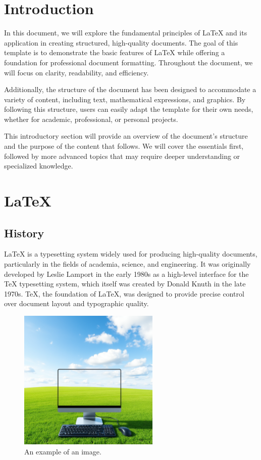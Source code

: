 \chapter{Introduction}

In this document, we will explore the fundamental principles of LaTeX and its application in creating structured, high-quality documents. The goal of this template is to demonstrate the basic features of LaTeX while offering a foundation for professional document formatting. Throughout the document, we will focus on clarity, readability, and efficiency.

Additionally, the structure of the document has been designed to accommodate a variety of content, including text, mathematical expressions, and graphics. By following this structure, users can easily adapt the template for their own needs, whether for academic, professional, or personal projects.

This introductory section will provide an overview of the document’s structure and the purpose of the content that follows. We will cover the essentials first, followed by more advanced topics that may require deeper understanding or specialized knowledge.



\newpage

\chapter{LaTeX}

\section{History}
LaTeX is a typesetting system widely used for producing high-quality documents, particularly in the fields of academia, science, and engineering. It was originally developed by Leslie Lamport in the early 1980s as a high-level interface for the TeX typesetting system, which itself was created by Donald Knuth in the late 1970s. TeX, the foundation of LaTeX, was designed to provide precise control over document layout and typographic quality.

\begin{figure}[h!]
	\centering
	\includegraphics[width=0.6\textwidth]{sources/FrontImg.png} %
	\caption{An example of an image.}
	\label{fig:frontimage}
\end{figure}

